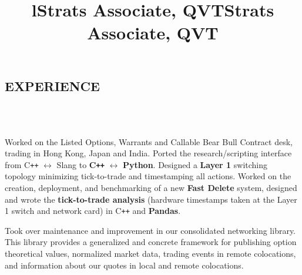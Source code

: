 \documentclass{res}
\begin{document}
 

\address{\\{\bf PERMANENT ADDRESS}\\2558 Breckeridge Ct.\\Aurora, IL 60504 \\+1 (630) 450-5725}
\address{\\{\bf PRESENT ADDRESS}\\159-163 Hollywood Rd, Apt 14B\\Hong Kong\\+852 6332 2390}


\begin{resume}

\section{EXPERIENCE}
\begin{format}
  \title{l}  \\
  \body\\
\end{format}

\title{\bf Strats Associate, QVT}
\begin{position}
	Worked on the Listed Options, Warrants and Callable Bear Bull Contract desk, trading in Hong Kong, Japan and India. Ported the research/scripting interface from C\texttt{++} $\leftrightarrow$ Slang to {\bf C\texttt{++}} $\leftrightarrow$ {\bf Python}. Designed a {\bf Layer 1} switching topology minimizing tick-to-trade and timestamping all actions. Worked on the creation, deployment, and benchmarking of a new {\bf Fast Delete} system, designed and wrote the {\bf tick-to-trade analysis} (hardware timestamps taken at the Layer 1 switch and network card) in C\texttt{++} and {\bf Pandas}.
\end{position}

\title{\bf Strats Associate, QVT}
\begin{position}
     Took over maintenance and improvement in our consolidated networking library. This library provides a generalized and concrete framework for publishing option theoretical values, normalized market data, trading events in remote colocations, and information about our quotes in local and remote colocations.
\end{position}


\end{resume}
\end{document}
